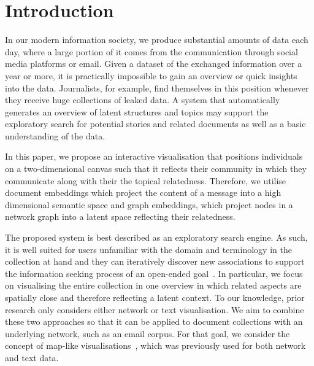 \section{Introduction}


In our modern information society, we produce substantial amounts of data each day, where a large portion of it comes from the communication through social media platforms or email.
Given a dataset of the exchanged information over a year or more, it is practically impossible to gain an overview or quick insights into the data.
Journalists, for example, find themselves in this position whenever they receive huge collections of leaked data.
A system that automatically generates an overview of latent structures and topics may support the exploratory search for potential stories and related documents as well as a basic understanding of the data.

In this paper, we propose an interactive visualisation that positions individuals on a two-dimensional canvas such that it reflects their community in which they communicate along with their the topical relatedness.
Therefore, we utilise document embeddings which project the content of a message into a high dimensional semantic space and graph embeddings, which project nodes in a network graph into a latent space reflecting their relatedness.

The proposed system is best described as an exploratory search engine.
As such, it is well suited for users unfamiliar with the domain and terminology in the collection at hand and they can iteratively discover new associations to support the information seeking process of an open-ended goal~\cite{white2009exploratory}.
In particular, we focus on visualising the entire collection in one overview in which related aspects are spatially close and therefore reflecting a latent context.
To our knowledge, prior research only considers either network or text visualisation.
We aim to combine these two approaches so that it can be applied to document collections with an underlying network, such as an email corpus.
For that goal, we consider the concept of map-like visualisations~\cite{pang2017creating}, which was previously used for both network and text data.

